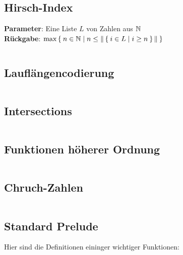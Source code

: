 \subsection{Hirsch-Index}%
\textbf{Parameter}: Eine Liste $L$ von Zahlen aus $\mathbb{N}$\\
\textbf{Rückgabe}: $\max \Set{n \in \ensuremath{\mathbb{N}}| n \leq \|\Set{i \in L | i \geq n}\|}$

\inputminted[linenos, numbersep=5pt, tabsize=4, frame=lines, label=hirsch-index.hs]{haskell}{scripts/haskell/hirsch-index.hs}

\subsection{Lauflängencodierung}%

\inputminted[linenos, numbersep=5pt, tabsize=4, frame=lines, label=lauflaengencodierung.hs]{haskell}{scripts/haskell/lauflaengencodierung.hs}

\subsection{Intersections}%

\inputminted[linenos, numbersep=5pt, tabsize=4, frame=lines, label=Intersect.hs]{haskell}{scripts/haskell/Intersect.hs}

\subsection{Funktionen höherer Ordnung}\label{bsp:foldl-und-foldr}
\inputminted[linenos, numbersep=5pt, tabsize=4, frame=lines, label=folds.hs]{haskell}{scripts/haskell/folds.hs}

\subsection{Chruch-Zahlen}
\inputminted[linenos, numbersep=5pt, tabsize=4, frame=lines, label=church.hs]{haskell}{scripts/haskell/church.hs}

\subsection{Standard Prelude}
Hier sind die Definitionen eininger wichtiger Funktionen:
\inputminted[numbersep=5pt, tabsize=4]{haskell}{scripts/haskell/standard-definitions.hs}

